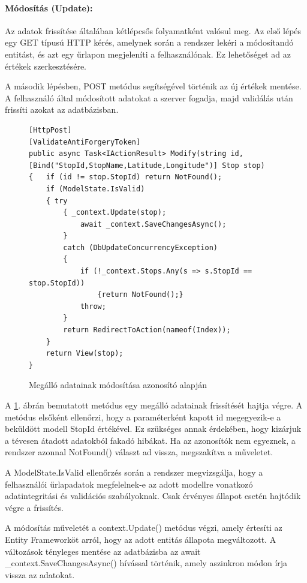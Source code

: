 \paragraph{Módosítás (Update):}
Az adatok frissítése általában kétlépcsős folyamatként valósul meg. Az első lépés egy GET típusú HTTP kérés, amelynek során a rendszer lekéri a módosítandó entitást, és azt egy űrlapon megjeleníti a felhasználónak. Ez lehetőséget ad az értékek szerkesztésére.

A második lépésben, POST metódus segítségével történik az új értékek mentése. A felhasználó által módosított adatokat a szerver fogadja, majd validálás után frissíti azokat az adatbázisban.

\begin{figure}[H]
\caption{Megálló adatainak módosítása azonosító alapján}
\label{fig:modify-stop-method}
\begin{minipage}{\textwidth}
\begin{BVerbatim}
[HttpPost]
[ValidateAntiForgeryToken]
public async Task<IActionResult> Modify(string id,
[Bind("StopId,StopName,Latitude,Longitude")] Stop stop)
{   if (id != stop.StopId) return NotFound();
    if (ModelState.IsValid)
    { try
        { _context.Update(stop);
            await _context.SaveChangesAsync();
        }
        catch (DbUpdateConcurrencyException)
        {
            if (!_context.Stops.Any(s => s.StopId == stop.StopId))
                {return NotFound();}
            throw;
        }
        return RedirectToAction(nameof(Index));
    }
    return View(stop);
}
\end{BVerbatim}
\end{minipage}
\end{figure}

A \ref{fig:modify-stop-method}. ábrán bemutatott metódus egy megálló adatainak frissítését hajtja végre. A metódus elsőként ellenőrzi, hogy a paraméterként kapott id megegyezik-e a beküldött modell StopId értékével. Ez szükséges annak érdekében, hogy kizárjuk a tévesen átadott adatokból fakadó hibákat. Ha az azonosítók nem egyeznek, a rendszer azonnal NotFound() választ ad vissza, megszakítva a műveletet.

A ModelState.IsValid ellenőrzés során a rendszer megvizsgálja, hogy a felhasználói űrlapadatok megfelelnek-e az adott modellre vonatkozó adatintegritási és validációs szabályoknak. Csak érvényes állapot esetén hajtódik végre a frissítés.

A módosítás műveletét a context.Update() metódus végzi, amely értesíti az Entity Frameworköt arról, hogy az adott entitás állapota megváltozott. A változások tényleges mentése az adatbázisba az await \_context.SaveChangesAsync() hívással történik, amely aszinkron módon írja vissza az adatokat.

